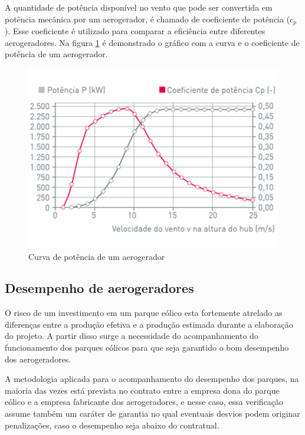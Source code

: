 A quantidade de potência disponível no vento que pode ser convertida em potência mecânica por um aerogerador, é chamado de coeficiente de potência ($c_p$). Esse coeficiente é utilizado para comparar a eficiência entre diferentes aerogeradores. Na figura \ref{Fig:ilustracaoCurvaPotencia} é demonstrado o gráfico com a curva e o coeficiente de potência de um aerogerador. 

\begin{figure}[htbp!] \begin{center}
\includegraphics[width=0.75\linewidth]{./figuras/curva-potencia-wobben}
\caption{Curva de potência de um aerogerador}
\label{Fig:ilustracaoCurvaPotencia}
\end{center} 
\end{figure}

\subsection{Desempenho de aerogeradores}
\label{Sec:desempenhoDeAerogeradores}

O risco de um investimento em um parque eólico esta fortemente atrelado as diferenças entre a produção efetiva e a produção estimada durante a elaboração do projeto. A partir disso surge a necessidade do acompanhamento do funcionamento dos parques eólicos para que seja garantido o bom desempenho dos aerogeradores.

A metodologia aplicada para o acompanhamento do desempenho dos parques, na maioria das vezes está prevista no contrato entre a empresa dona do parque eólico e a empresa fabricante dos aerogeradores, e nesse caso, essa verificação assume também um caráter de garantia no qual eventuais desvios podem originar penalizações, caso o desempenho seja abaixo do contratual.

